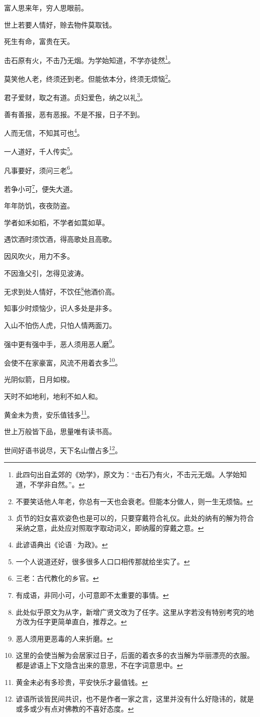 \documentclass[12pt,oneside]{book}
\begin{document}
富人思来年，穷人思眼前。

世上若要人情好，赊去物件莫取钱。

死生有命，富贵在天。

击石原有火，不击乃无烟。为学始知道，不学亦徒然\footnote{此四句出自孟郊的《劝学》，原文为：“击石乃有火，不击元无烟。人学始知道，不学非自然。”。}。

莫笑他人老，终须还到老。但能依本分，终须无烦恼\footnote{不要笑话他人年老，你总有一天也会衰老。但能本分做人，则一生无烦恼。}。

君子爱财，取之有道。贞妇爱色，纳之以礼\footnote{贞节的妇女喜欢姿色也是可以的，只要穿戴符合礼仪。此处的纳有的解为符合采纳之意，此处应对照取字取动词义，即纳履的穿戴之意。}。

善有善报，恶有恶报。不是不报，日子不到。

人而无信，不知其可也\footnote{此谚语典出《论语·为政》。}。

一人道好，千人传实\footnote{一个人说道还好，很多很多人口口相传那就给坐实了。}。

凡事要好，须问三老\footnote{三老：古代教化的乡官。}。

若争小可\footnote{有成语，非同小可，小可意即不太重要的事情。}，便失大道。

年年防饥，夜夜防盗。

学者如禾如稻，不学者如蒿如草。

遇饮酒时须饮酒，得高歌处且高歌。

因风吹火，用力不多。

不因渔父引，怎得见波涛。

无求到处人情好，不饮任\footnote{此处似乎原文为从字，新增广贤文改为了任字。这里从字若没有特别考究的地方改为任字更简单直白，推荐之。}他酒价高。

知事少时烦恼少，识人多处是非多。

入山不怕伤人虎，只怕人情两面刀。

强中更有强中手，恶人须用恶人磨\footnote{恶人须用更恶毒的人来折磨。}。

会使不在家豪富，风流不用着衣多\footnote{这里的会使当解为会居家过日子，后面的着衣多的衣当解为华丽漂亮的衣服。都是谚语上下文隐含出来的意思，不在字词意思中。}。

光阴似箭，日月如梭。

天时不如地利，地利不如人和。

黄金未为贵，安乐值钱多\footnote{黄金未必有多珍贵，平安快乐才最值钱。}。

世上万般皆下品，思量唯有读书高。

世间好语书说尽，天下名山僧占多\footnote{谚语所谈皆民间共识，也不是作者一家之言，这里并没有什么好隐讳的，就是或多或少有点对佛教的不喜好态度。}。
\end{document}
